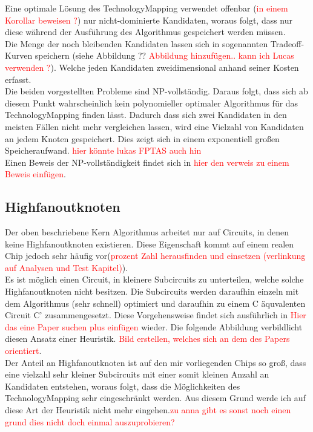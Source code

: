 \documentclass[11pt, a4paper, german]{article}
\newcommand{\TM}{TechnologyMapping }
\begin{document}
Eine optimale Lösung des \TM verwendet offenbar (\textcolor{red}{in einem Korollar beweisen ?}) nur nicht-dominierte Kandidaten, woraus folgt, dass nur diese während der Ausführung des Algorithmus gespeichert werden müssen.\\
Die Menge der noch bleibenden Kandidaten lassen sich in sogenannten Tradeoff-Kurven speichern (siehe Abbildung ?? \textcolor{red}{Abbildung hinzufügen.. kann ich Lucas verwenden ?}). Welche jeden Kandidaten zweidimensional anhand seiner Kosten erfasst.\\

Die beiden vorgestellten Probleme sind NP-vollständig. Daraus folgt, dass sich ab diesem Punkt wahrscheinlich  kein polynomieller optimaler Algorithmus für das \TM finden lässt. Dadurch dass sich zwei Kandidaten in den meisten Fällen nicht mehr vergleichen lassen, wird eine Vielzahl von Kandidaten an jedem Knoten gespeichert. Dies zeigt sich in einem exponentiell großen Speicheraufwand.  \textcolor{red}{hier könnte lukas FPTAS auch hin}\\
Einen Beweis der NP-vollständigkeit findet sich in \textcolor{red}{hier den verweis zu einem Beweis einfügen}.

\subsection{Highfanoutknoten}
Der oben beschriebene Kern Algorithmus arbeitet nur auf Circuits, in denen keine Highfanoutknoten existieren. Diese Eigenschaft kommt auf einem realen Chip jedoch sehr häufig vor(\textcolor{red}{prozent Zahl herausfinden und einsetzen (verlinkung auf Analysen und Test Kapitel)}).\\
 Es ist möglich einen Circuit, in kleinere Subcircuits zu unterteilen, welche solche Highfanoutknoten nicht besitzen. Die Subcircuits werden daraufhin einzeln mit dem Algorithmus (sehr schnell) optimiert und daraufhin zu einem C äquvalenten Circuit C' zusammengesetzt. Diese Vorgehensweise findet sich ausführlich in \textcolor{red}{Hier das eine Paper suchen plus einfügen} wieder. Die folgende Abbildung verbildlicht diesen Ansatz einer Heuristik. \textcolor{red}{Bild erstellen, welches sich an dem des Papers orientiert}.\\
  Der Anteil an Highfanoutknoten ist auf den mir vorliegenden Chips so groß, dass eine vielzahl sehr kleiner Subcircuits mit einer somit kleinen Anzahl an Kandidaten entstehen, woraus folgt, dass die Möglichkeiten des \TM sehr eingeschränkt werden. Aus diesem Grund werde ich auf diese Art der   Heuristik nicht mehr eingehen.\textcolor{red}{zu anna gibt es sonst noch einen grund dies nicht doch einmal auszuprobieren?}\\
\end{document}
